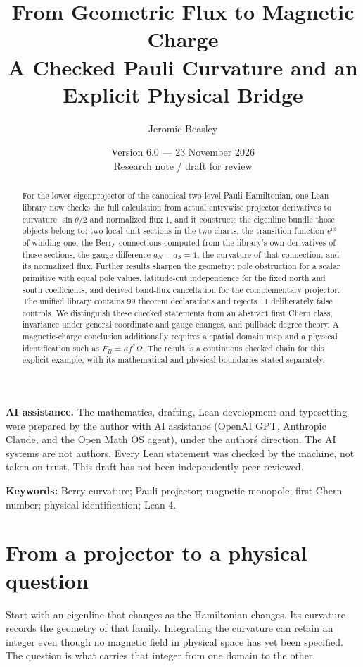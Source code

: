 \documentclass[11pt]{article}
\title{\vspace{-1.5em}From Geometric Flux to Magnetic Charge\\[0.4em]\large A Checked Pauli Curvature and an Explicit Physical Bridge}
\author{Jeromie Beasley}
\date{Version 6.0 --- 23 November 2026\\\small Research note / draft for review}
\theoremstyle{definition}\newtheorem{definition}[theorem]{Definition}
\theoremstyle{remark}\newtheorem{remark}[theorem]{Remark}
\newcommand{\ii}{\mathrm{i}}
\begin{document}
\maketitle
{\small\noindent\textbf{AI assistance.} The mathematics, drafting, Lean development and typesetting were prepared by the author with AI assistance (OpenAI GPT, Anthropic Claude, and the Open Math OS agent), under the author\'s direction. The AI systems are not authors. Every Lean statement was checked by the machine, not taken on trust. This draft has not been independently peer reviewed.\par}
\begin{abstract}
For the lower eigenprojector of the canonical two-level Pauli Hamiltonian, one Lean library now checks the full calculation from actual entrywise projector derivatives to curvature $\sin\theta/2$ and normalized flux $1$, and it constructs the eigenline bundle those objects belong to: two local unit sections in the two charts, the transition function $e^{\ii\phi}$ of winding one, the Berry connections computed from the library’s own derivatives of those sections, the gauge difference $a_N-a_S=1$, the curvature of that connection, and its normalized flux. Further results sharpen the geometry: pole obstruction for a scalar primitive with equal pole values, latitude-cut independence for the fixed north and south coefficients, and derived band-flux cancellation for the complementary projector. The unified library contains 99 theorem declarations and rejects 11 deliberately false controls. We distinguish these checked statements from an abstract first Chern class, invariance under general coordinate and gauge changes, and pullback degree theory. A magnetic-charge conclusion additionally requires a spatial domain map and a physical identification such as $F_B=\kappa f^*\Omega$. The result is a continuous checked chain for this explicit example, with its mathematical and physical boundaries stated separately.

\end{abstract}
\noindent\textbf{Keywords:} Berry curvature; Pauli projector; magnetic monopole; first Chern number; physical identification; Lean 4.

\section{From a projector to a physical question}
Start with an eigenline that changes as the Hamiltonian changes. Its curvature records the geometry of that family. Integrating the curvature can retain an integer even though no magnetic field in physical space has yet been specified. The question is what carries that integer from one domain to the other.
\end{document}
